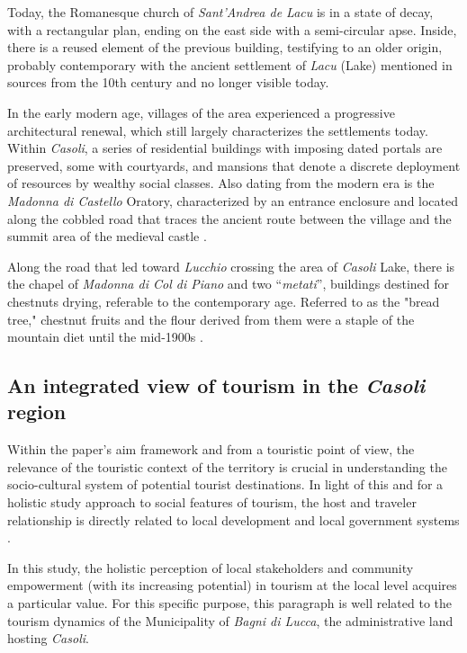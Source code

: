 \documentclass[sustainability,article,submit,pdftex,moreauthors]{Definitions/mdpi}
\begin{document}
Today, the Romanesque church of \textit{Sant'Andrea de Lacu} is in a state of decay, with a rectangular plan, ending on the east side with a semi-circular apse. Inside, there is a reused element of the previous building, testifying to an older origin, probably contemporary with the ancient settlement of \textit{Lacu} (Lake) mentioned in sources from the 10th century and no longer visible today.

In the early modern age, villages of the area experienced a progressive architectural renewal, which still largely characterizes the settlements today. Within \emph{Casoli}, a series of residential buildings with imposing dated portals are preserved, some with courtyards, and mansions that denote a discrete deployment of resources by wealthy social classes. Also dating from the modern era is the \textit{Madonna di Castello} Oratory, characterized by an entrance enclosure and located along the cobbled road that traces the ancient route between the village and the summit area of the medieval castle \cite{gia96}.

Along the road that led toward \textit{Lucchio} crossing the area of \emph{Casoli} Lake, there is the chapel of \textit{Madonna di Col di Piano} and two “\textit{metati}”, buildings destined for chestnuts drying, referable to the contemporary age. Referred to as the "bread tree," chestnut fruits and the flour derived from them were a staple of the mountain diet until the mid-1900s \cite{buc92, puc10}.


\subsection{An integrated view of tourism in the \emph{Casoli} region}


Within the paper's aim framework and from a touristic point of view, the relevance of the touristic context of the territory is crucial in understanding the socio-cultural system of potential tourist destinations. In light of this and for a holistic study approach to social features of tourism, the host and traveler relationship is directly related to local development and local government systems \cite{amo21}.

In this study, the holistic perception of local stakeholders and community empowerment (with its increasing potential) in tourism at the local level acquires a particular value. For this specific purpose, this paragraph is well related to the tourism dynamics of the Municipality of \emph{Bagni di Lucca}, the administrative land hosting \emph{Casoli}. 
\end{document}
